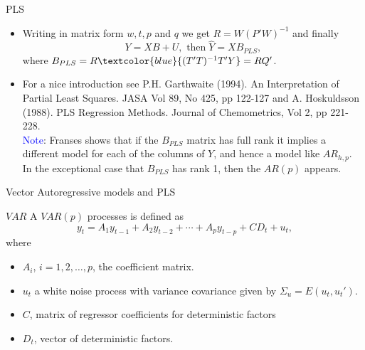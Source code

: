 \documentclass{beamer}
\newcommand{\?}{?`}
\begin{document}
\begin{frame}{PLS}
  \begin{itemize}
  \item Writing in matrix form $w,t,p$ and $q$ we get $R=W(P'W)^{-1}$ and
   finally
    \begin{displaymath}
      Y=XB+U, \text{ then} \; \hat{Y}=XB_{PLS},
    \end{displaymath}
    where $B_{PLS}=R\textcolor{blue}{(T'T)^{-1}T'Y}=RQ'$.
  \item     \bigskip

    For a nice introduction see P.H. Garthwaite
    (1994). An Interpretation of Partial Least Squares. JASA Vol 89,
    No 425, pp 122-127 and A. Hoskuldsson (1988). PLS Regression Methods. Journal of
    Chemometrics, Vol 2, pp 221-228.\\
    \medskip
    \textcolor{blue}{Note}: Franses shows that if  the $B_{PLS}$ matrix has full rank it implies a different model for
each of the columns of $Y$, and hence a model like $AR_{h,p}$. In the exceptional case that
$B_{PLS}$ has rank 1, then the $AR(p)$ appears.
  \end{itemize}
\end{frame}

\begin{frame}{}
  \begin{block}{}
    \begin{center}
      \vspace{3mm}
      {\Large Vector Autoregressive models and PLS}
      \vspace{3mm}
    \end{center}
  \end{block}
\end{frame}

\begin{frame}{$VAR$}
  A $VAR(p)$ processes is defined as
    \begin{displaymath}
      y_t=A_1y_{t-1} + A_2y_{t-2} + \cdots + A_py_{t-p} + CD_t + u_t,
    \end{displaymath}
  where
    \begin{itemize}
    \item $A_i$, $i=1,2,\ldots, p$, the coefficient matrix.
    \item $u_t$ a white noise process
     with variance covariance given by $\Sigma_u=E(u_t,u_t')$.
    \item $C$,  matrix of regressor coefficients for deterministic factors
    \item $D_t$, vector of deterministic factors.
    \end{itemize}
\end{frame}
\end{document}
